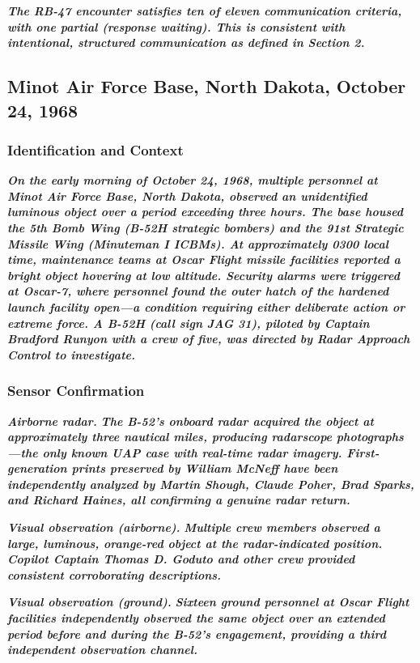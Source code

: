 \documentclass[11pt,letterpaper]{article}
\begin{document}
\textbf{\textit{The RB-47 encounter satisfies ten of eleven communication criteria, with one partial (response waiting). This is consistent with intentional, structured communication as defined in Section 2.}}


\subsection{Minot Air Force Base, North Dakota, October 24, 1968}

\subsubsection{Identification and Context}

\textbf{\textit{On the early morning of October 24, 1968, multiple personnel at Minot Air Force Base, North Dakota, observed an unidentified luminous object over a period exceeding three hours. The base housed the 5th Bomb Wing (B-52H strategic bombers) and the 91st Strategic Missile Wing (Minuteman I ICBMs). At approximately 0300 local time, maintenance teams at Oscar Flight missile facilities reported a bright object hovering at low altitude. Security alarms were triggered at Oscar-7, where personnel found the outer hatch of the hardened launch facility open---a condition requiring either deliberate action or extreme force. A B-52H (call sign JAG 31), piloted by Captain Bradford Runyon with a crew of five, was directed by Radar Approach Control to investigate.}}


\subsubsection{Sensor Confirmation}

\textbf{\textit{Airborne radar.}}\textbf{\textit{ The B-52's onboard radar acquired the object at approximately three nautical miles, producing radarscope photographs---the only known UAP case with real-time radar imagery. First-generation prints preserved by William McNeff have been independently analyzed by Martin Shough, Claude Poher, Brad Sparks, and Richard Haines, all confirming a genuine radar return.}}


\textbf{\textit{Visual observation (airborne).}}\textbf{\textit{ Multiple crew members observed a large, luminous, orange-red object at the radar-indicated position. Copilot Captain Thomas D. Goduto and other crew provided consistent corroborating descriptions.}}


\textbf{\textit{Visual observation (ground).}}\textbf{\textit{ Sixteen ground personnel at Oscar Flight facilities independently observed the same object over an extended period before and during the B-52's engagement, providing a third independent observation channel.}}
\end{document}
